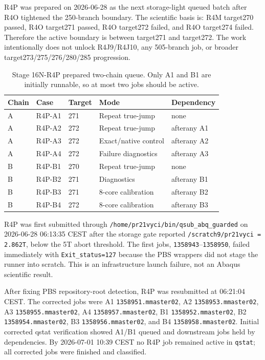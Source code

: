 \documentclass[11pt,a4paper]{article}
\newcommand{\code}[1]{\texttt{#1}}
\begin{document}
R4P was prepared on 2026-06-28 as the next storage-light queued batch after R4O tightened the 250-branch boundary. The scientific basis is: R4M target270 passed, R4O target271 passed, R4O target272 failed, and R4O target274 failed. Therefore the active boundary is between target271 and target272. The work intentionally does not unlock R4J9/R4J10, any 505-branch job, or broader target273/275/276/280/285 progression.

\begin{table}[H]
\centering
\small
\begin{tabular}{lllll}
\toprule
Chain & Case & Target & Mode & Dependency \\
\midrule
A & R4P-A1 & 271 & Repeat true-jump & none \\
A & R4P-A2 & 272 & Repeat true-jump & afterany A1 \\
A & R4P-A3 & 272 & Exact/native control & afterany A2 \\
A & R4P-A4 & 272 & Failure diagnostics & afterany A3 \\
B & R4P-B1 & 270 & Repeat true-jump & none \\
B & R4P-B2 & 271 & Diagnostics & afterany B1 \\
B & R4P-B3 & 271 & 8-core calibration & afterany B2 \\
B & R4P-B4 & 272 & 8-core calibration & afterany B3 \\
\bottomrule
\end{tabular}
\caption{Stage 16N-R4P prepared two-chain queue. Only A1 and B1 are initially runnable, so at most two jobs should be active.}
\end{table}

R4P was first submitted through \code{/home/pr21vyci/bin/qsub\_abq\_guarded} on 2026-06-28 06:13:35 CEST after the storage gate reported \code{/scratch9/pr21vyci = 2.862T}, below the 5T abort threshold. The first jobs, \code{1358943}--\code{1358950}, failed immediately with \code{Exit\_status=127} because the PBS wrappers did not stage the runner into scratch. This is an infrastructure launch failure, not an Abaqus scientific result.

After fixing PBS repository-root detection, R4P was resubmitted at 06:21:04 CEST. The corrected jobs were A1 \code{1358951.mmaster02}, A2 \code{1358953.mmaster02}, A3 \code{1358955.mmaster02}, A4 \code{1358957.mmaster02}, B1 \code{1358952.mmaster02}, B2 \code{1358954.mmaster02}, B3 \code{1358956.mmaster02}, and B4 \code{1358958.mmaster02}. Initial corrected qstat verification showed A1/B1 queued and downstream jobs held by dependencies. By 2026-07-01 10:39 CEST no R4P job remained active in \code{qstat}; all corrected jobs were finished and classified.
\end{document}
